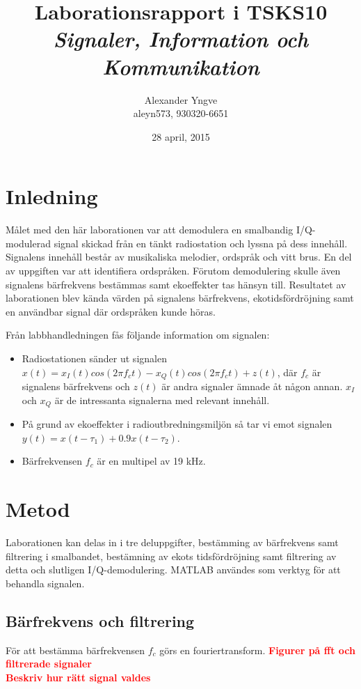 \documentclass[10pt,twocolumn]{article}
\title{Laborationsrapport i TSKS10 \emph{Signaler, Information och Kommunikation}}
\author{Alexander Yngve\\aleyn573, 930320-6651}
\date{28 april, 2015}
\newcommand{\todo}[1]{\textbf{\textcolor{red}{#1}}}
\begin{document}
\begin{figure}
  
\end{figure}

\maketitle

\clearpage

\section{Inledning}

Målet med den här laborationen var att demodulera en smalbandig I/Q-modulerad signal skickad från en tänkt radiostation och lyssna på dess innehåll. Signalens innehåll består av musikaliska melodier, ordspråk och vitt brus. En del av uppgiften var att identifiera ordspråken. Förutom demodulering skulle även signalens bärfrekvens bestämmas samt ekoeffekter tas hänsyn till. Resultatet av laborationen blev kända värden på signalens bärfrekvens, ekotidsfördröjning samt en användbar signal där ordspråken kunde höras.

Från labbhandledningen fås följande information om signalen:

\begin{itemize}
\item Radiostationen sänder ut signalen $x(t) = x_I(t)cos(2\pi f_ct) - x_Q(t)cos(2\pi f_ct) + z(t)$, där $f_c$ är signalens bärfrekvens och $z(t)$ är andra signaler ämnade åt någon annan. $x_I$ och $x_Q$ är de intressanta signalerna med relevant innehåll.
\item På grund av ekoeffekter i radioutbredningsmiljön så tar vi emot signalen $y(t) = x(t - \tau_1) + 0.9x(t - \tau_2)$. 
\item Bärfrekvensen $f_c$ är en multipel av 19 kHz.
\end{itemize}

\section{Metod}

Laborationen kan delas in i tre deluppgifter, bestämming av bärfrekvens samt filtrering i smalbandet, bestämning av ekots tidsfördröjning samt filtrering av detta och slutligen I/Q-demodulering. MATLAB användes som verktyg för att behandla signalen.

\subsection{Bärfrekvens och filtrering}
För att bestämma bärfrekvensen $f_c$ görs en fouriertransform. 
\todo{Figurer på fft och filtrerade signaler} \\
\todo{Beskriv hur rätt signal valdes} \\
\end{document}
